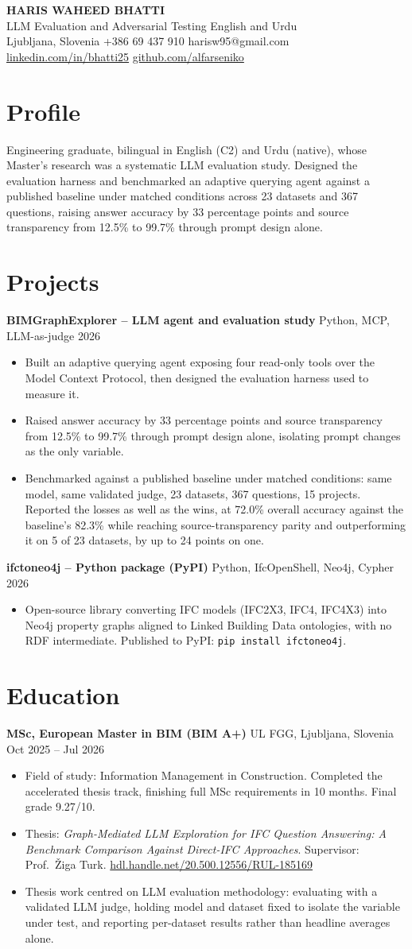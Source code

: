 \documentclass[a4paper,10.5pt]{article}
\newcommand{\datefill}{\dotfill}
\newcommand{\entry}[3]{\vspace{2.5pt}\noindent\textbf{#1} \textbar{} #2 \datefill{} #3\par\vspace{0.5pt}}
\newcommand{\ROLELINE}{LLM Evaluation and Adversarial Testing \textbar{} English and Urdu}
\newcommand{\projIfcToNeo}{%
\entry{ifctoneo4j -- Python package (PyPI)}{Python, IfcOpenShell, Neo4j, Cypher}{2026}
\begin{itemize}
  \item Open-source library converting IFC models (IFC2X3, IFC4, IFC4X3) into Neo4j
        property graphs aligned to Linked Building Data ontologies, with no RDF
        intermediate. Published to PyPI: \texttt{pip install ifctoneo4j}.
\end{itemize}}
\newcommand{\projBIMGraph}{%
\entry{BIMGraphExplorer -- LLM agent and evaluation study}{Python, MCP, LLM-as-judge}{2026}
\begin{itemize}
  \item Built an adaptive querying agent exposing four read-only tools over the Model
        Context Protocol, then designed the evaluation harness used to measure it.
  \item Raised answer accuracy by 33 percentage points and source transparency from
        12.5\% to 99.7\% through prompt design alone, isolating prompt changes as the
        only variable.
  \item Benchmarked against a published baseline under matched conditions: same model,
        same validated judge, 23 datasets, 367 questions, 15 projects. Reported the
        losses as well as the wins, at 72.0\% overall accuracy against the baseline's
        82.3\% while reaching source-transparency parity and outperforming it on 5 of
        23 datasets, by up to 24 points on one.
\end{itemize}}
\begin{document}
\begin{center}
  {\LARGE\bfseries HARIS WAHEED BHATTI}\\[2pt]
  {\large \ROLELINE}\\[3pt]
  Ljubljana, Slovenia \textbar{} +386 69 437 910 \textbar{} harisw95@gmail.com\\
  \href{https://linkedin.com/in/bhatti25}{linkedin.com/in/bhatti25} \textbar{}
  \href{https://github.com/alfarseniko}{github.com/alfarseniko}
\end{center}
\vspace{-4pt}

\section{Profile}

\noindent Engineering graduate, bilingual in English (C2) and Urdu (native), whose
Master's research was a systematic LLM evaluation study. Designed the evaluation
harness and benchmarked an adaptive querying agent against a published baseline under
matched conditions across 23 datasets and 367 questions, raising answer accuracy by 33
percentage points and source transparency from 12.5\% to 99.7\% through prompt design
alone.

\section{Projects}

 \projBIMGraph \projIfcToNeo

\section{Education}
\entry{MSc, European Master in BIM (BIM A+)}{UL FGG, Ljubljana, Slovenia}{Oct 2025 -- Jul 2026}
\begin{itemize}
  \item Field of study: Information Management in Construction. Completed the
        accelerated thesis track, finishing full MSc requirements in 10 months.
        Final grade 9.27/10.
  \item Thesis: \textit{Graph-Mediated LLM Exploration for IFC Question Answering:
        A Benchmark Comparison Against Direct-IFC Approaches}. Supervisor:
        Prof.~\v{Z}iga Turk. \href{http://hdl.handle.net/20.500.12556/RUL-185169}{hdl.handle.net/20.500.12556/RUL-185169}
  \item Thesis work centred on LLM evaluation methodology: evaluating with a validated
        LLM judge, holding model and dataset fixed to isolate the variable under test,
        and reporting per-dataset results rather than headline averages alone.
\end{itemize}
\end{document}
